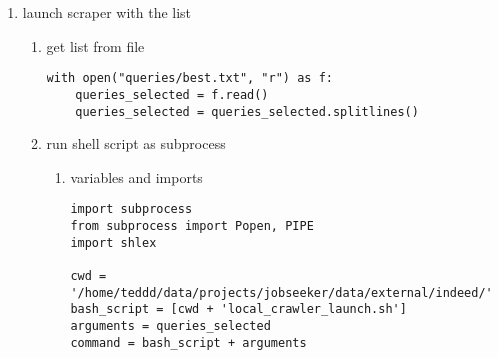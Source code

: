 \documentclass[11pt]{article}
\begin{document}
\begin{enumerate}
\begin{enumerate}
\begin{enumerate}
\begin{verbatim}
queries["entries"] = queries.path.apply(entries_count)
\end{verbatim}
\end{enumerate}

\item inspection
\label{sec:orgb47c0a0}
\begin{verbatim}
import humanize
queries["size_for_humans"] = queries["size"].apply(humanize.naturalsize)
queries.sort_values("size", ascending=False)[["name", "size_for_humans", "entries"]].reset_index()
\end{verbatim}

\item time evolution
\label{sec:orgd6d7736}
\item return list for next scraper launch
\label{sec:org1a7dc62}
\begin{enumerate}
\item remove null size results before (or not)
\label{sec:org2702d8a}
\begin{verbatim}
queries_list = list(set(queries.name))
\end{verbatim}
\item save in a file for editing
\label{sec:orge343e36}
\begin{verbatim}
with open("/queries/queries.txt", "w") as f:
    for query in queries_list:
	f.write(query + "\n")
\end{verbatim}
\end{enumerate}
\end{enumerate}
\item launch scraper with the list
\label{sec:org72f4e7f}
\begin{enumerate}
\item get list from file
\label{sec:org3de758e}
\begin{verbatim}
with open("queries/best.txt", "r") as f:
    queries_selected = f.read()
    queries_selected = queries_selected.splitlines()
\end{verbatim}

\item run shell script as subprocess
\label{sec:org48e3984}
\begin{enumerate}
\item variables and imports
\label{sec:org928346d}
\begin{verbatim}
import subprocess
from subprocess import Popen, PIPE
import shlex

cwd = '/home/teddd/data/projects/jobseeker/data/external/indeed/'
bash_script = [cwd + 'local_crawler_launch.sh']
arguments = queries_selected
command = bash_script + arguments
\end{verbatim}


\end{enumerate}
\end{enumerate}
\end{enumerate}
\end{document}
